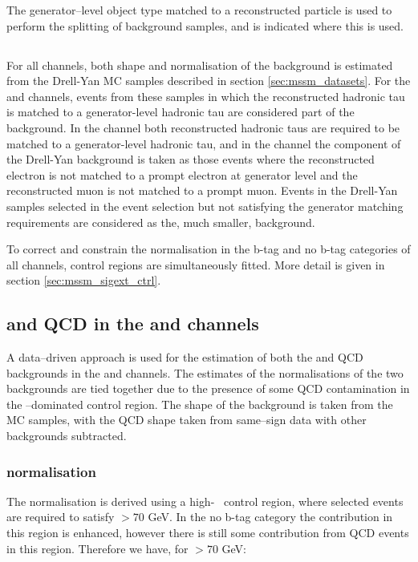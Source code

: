 The generator--level object type matched to a 
reconstructed particle is used to perform the splitting
of background samples, and is indicated where this is used.


\subsection{\texorpdfstring{\Ztautau}{Z to tau tau}}
\label{sec:mssm_bkgs_ztt}
For all channels, both shape and normalisation of the \Ztautau background 
is estimated from the Drell-Yan
\ac{MC} samples described in section \ref{sec:mssm_datasets}.
For the \mutau and \etau channels, events from these samples 
in which the reconstructed hadronic tau is matched to 
a generator-level hadronic tau are considered part of the \Ztautau
background. In the \tautau channel both reconstructed
hadronic taus are required to be matched to a generator-level hadronic tau, and
in the \emu channel the \Ztautau component of the Drell-Yan background 
is taken as those events where the reconstructed electron is not matched to
a prompt electron at generator level and the reconstructed
muon is not matched to a prompt muon. 
Events in the Drell-Yan samples selected in the event selection
but not satisfying the generator matching requirements are considered
as the, much smaller, \Zll background.

To correct and constrain the \Ztautau normalisation in the
b-tag and no b-tag categories of all channels, \Zmm control
regions are simultaneously fitted. More detail is given in 
section \ref{sec:mssm_sigext_ctrl}.

\subsection{\texorpdfstring{\Wjets and QCD in the \etau and \mutau channels}{W+jets and QCD in the e tau and mu tau channels}}
\label{sec:mssm_bkgs_mtet_wjetsqcd}
A data--driven approach is used for the estimation of
both the \Wjets and QCD backgrounds in the \etau and \mutau channels. 
The estimates of the normalisations of the two backgrounds are tied
together due to the presence of some QCD contamination in the \Wjets--dominated
control region. The shape of the \Wjets background is taken
from the \ac{MC} samples, with the QCD shape taken from same--sign
data with other backgrounds subtracted.

\subsubsection{\texorpdfstring{\Wjets normalisation}{W+jets normalisation}}
\label{sec:mssm_bkgs_mtet_wjetsnorm}
The \Wjets normalisation is derived using a high-\mT~ control region, where
selected events are required to satisfy \mT$>70$ GeV. In the no b-tag
category the \Wjets
contribution in this region is enhanced, however there is still
some contribution from QCD events in this region. Therefore we
have, for \mT$>70$ GeV:

